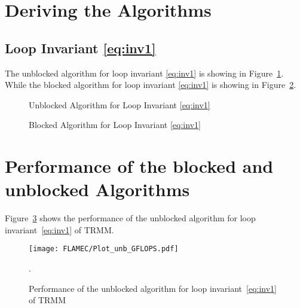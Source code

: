 \documentclass[12pt]{article}
\begin{document}
\section{Deriving the Algorithms}

\subsection{Loop Invariant \eqref{eq:inv1}}

The unblocked algorithm for loop invariant \eqref{eq:inv1} is showing in Figure~\ref{fig:unb_inv1}. While the blocked algorithm for loop invariant \eqref{eq:inv1} is showing in Figure~\ref{fig:blk_inv1}.


\resetsteps



\begin{figure}
	\begin{center}
		\FlaWorksheet
	\end{center}
	\caption{Unblocked Algorithm for Loop Invariant \eqref{eq:inv1}}
	\label{fig:unb_inv1}
\end{figure}


\resetsteps



\begin{figure}
	\begin{center}
		\FlaWorksheet
	\end{center}
	\caption{Blocked Algorithm for Loop Invariant \eqref{eq:inv1}}
	\label{fig:blk_inv1}
\end{figure}

\section{Performance of the blocked and unblocked Algorithms}

Figure~\ref{fig:unbAlg1} shows the performance of the unblocked algorithm for loop invariant~\ref{eq:inv1} of TRMM.

\begin{figure}
\texttt{[image: FLAMEC/Plot\_unb\_GFLOPS.pdf]}
\caption{Performance of the unblocked algorithm for loop invariant~\ref{eq:inv1} of TRMM}.
\label{fig:unbAlg1}
\end{figure}
\end{document}
